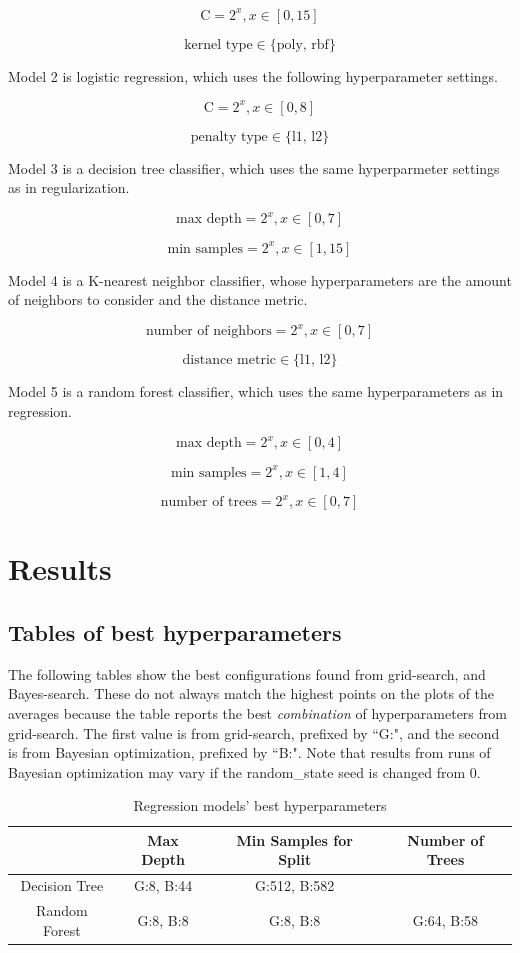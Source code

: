 \documentclass[12pt, letterpaper]{article}
\begin{document}
$$
\text{C} = 2^x, x \in [0,15]
$$

$$
\text{kernel type} \in \{\text{poly, rbf}\}
$$

Model 2 is logistic regression, which uses the following hyperparameter settings.

$$
\text{C} = 2^x, x \in [0,8]
$$

$$
\text{penalty type} \in \{\text{l1, l2}\}
$$

Model 3 is a decision tree classifier, which uses the same hyperparmeter settings as in regularization.

$$
\text{max depth} = 2^x, x \in [0,7]
$$

$$
\text{min samples} = 2^x, x \in [1,15]
$$

Model 4 is a K-nearest neighbor classifier, whose hyperparameters are the amount of neighbors to consider and the distance metric.

$$
\text{number of neighbors} = 2^x, x \in [0,7]
$$

$$
\text{distance metric} \in \{\text{l1, l2}\}
$$

Model 5 is a random forest classifier, which uses the same hyperparameters as in regression.

$$
\text{max depth} = 2^x, x \in [0,4]
$$

$$
\text{min samples} = 2^x, x \in [1,4]
$$

$$
\text{number of trees} = 2^x, x \in [0,7]
$$

\section{Results} %

\subsection{Tables of best hyperparameters}

The following tables show the best configurations found from grid-search, and Bayes-search. These do not always match the highest points on the plots of the averages because the table reports the best \emph{combination} of hyperparameters from grid-search. The first value is from grid-search, prefixed by ``G:", and the second is from Bayesian optimization, prefixed by ``B:". Note that results from runs of Bayesian optimization may vary if the random\_state seed is changed from 0.

\begin{table}[H]
\centering
\caption{Regression models' best hyperparameters}
\label{reg_table}
\begin{tabular}{c|c|c|c} %
                & Max Depth     & Min Samples for Split & Number of Trees \\ \hline
Decision Tree   & G:8, B:44            & G:512, B:582                  &   \\
Random Forest   & G:8, B:8             & G:8, B:8                    & G:64, B:58 \\
\end{tabular}
\end{table}
\end{document}
